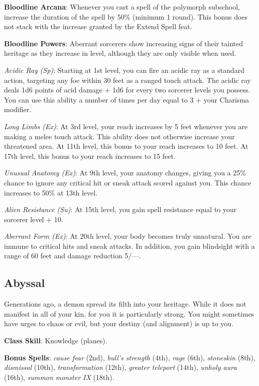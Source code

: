 \textbf{Bloodline Arcana}: Whenever you cast a spell of the polymorph subschool, increase the duration of the spell by 50\% 
(minimum 1 round). This bonus does not stack with the increase granted by the Extend Spell feat.
				
\textbf{Bloodline Powers}: Aberrant sorcerers show increasing signs of their tainted heritage as they increase in level, although 
they are only visible when used.
				
\textit{Acidic Ray (Sp)}: Starting at 1st level, you can fire an acidic ray as a standard action, targeting any foe within 30 
feet as a ranged touch attack. The acidic ray deals 1d6 points of acid damage + 1d6 for every two sorcerer levels you possess. You
can use this ability a number of times per day equal to 3 + your Charisma modifier.
				
\textit{Long Limbs (Ex)}: At 3rd level, your reach increases by 5 feet whenever you are making a melee touch attack. This ability
does not otherwise increase your threatened area. At 11th level, this bonus to your reach increases to 10 feet. At 17th level, 
this bonus to your reach increases to 15 feet.
				
\textit{Unusual Anatomy (Ex)}: At 9th level, your anatomy changes, giving you a 25\% chance to ignore any critical hit or sneak 
attack scored against you. This chance increases to 50\% at 13th level.
				
\textit{Alien Resistance (Su)}: At 15th level, you gain spell resistance equal to your sorcerer level + 10.
				
\textit{Aberrant Form (Ex)}: At 20th level, your body becomes truly unnatural. You are immune to critical hits and sneak attacks.
In addition, you gain blindsight with a range of 60 feet and damage reduction 5/---.
				
\subsection{Abyssal}

				
Generations ago, a demon spread its filth into your heritage. While it does not manifest in all of your kin, for you it is particularly
strong. You might sometimes have urges to chaos or evil, but your destiny (and alignment) is up to you.
				
\textbf{Class Skill}: Knowledge (planes).
				
\textbf{Bonus Spells}: \textit{cause fear} (2nd), \textit{bull's strength} (4th), \textit{rage} (6th), \textit{stoneskin} (8th), 
\textit{dismissal} (10th), \textit{transformation} (12th), \textit{greater teleport} (14th), \textit{unholy aura} (16th), 
\textit{summon monster IX} (18th).
				
